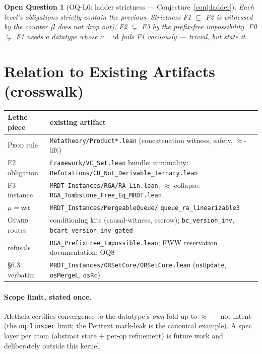\documentclass[11pt]{article}
\newtheorem{openq}[theorem]{Open Question}
\newcommand{\lean}[1]{\texttt{#1}}
\newcommand{\eqobs}{\approx}
\newcommand{\wit}{\mathsf{wit}}
\begin{document}
\begin{openq}[OQ-L6: ladder strictness --- Conjecture~\ref{conj:ladder}]
\label{oq:strictness}
Each level's obligations strictly contain the previous. Strictness
F1 $\subsetneq$ F2 is witnessed by the counter ($l$ does not drop out);
F2 $\subsetneq$ F3 by the prefix-free impossibility. F0 $\subsetneq$ F1
needs a datatype whose $\nu = \mathrm{id}$ fails F1 vacuously --- trivial,
but state it.
\end{openq}

\section{Relation to Existing Artifacts (crosswalk)}\label{sec:crosswalk}

\begin{center}
\small
\begin{tabular}{@{}lp{3.6in}@{}}
\toprule
Lethe piece & existing artifact \\
\midrule
\textsc{Prod} rule & \lean{Metatheory/Product*.lean} (concatenation
  witness, safety, $\eqobs$-lift) \\
F2 obligation & \lean{Framework/VC\_Set.lean} bundle; minimality:
  \lean{Refutations/CD\_Not\_Derivable\_Ternary.lean} \\
F3 instance & \lean{MRDT\_Instances/RGA/RA\_Lin.lean};
  $\eqobs$-collapse: \lean{RGA\_Tombstone\_Free\_Eq\_MRDT.lean} \\
$\mu = \wit$ & \lean{MRDT\_Instances/MergeableQueue/}
  \lean{queue\_ra\_linearizable3} \\
\textsc{Guard} routes & conditioning kits (causal-witness, escrow);
  \lean{bc\_version\_inv}, \lean{bcart\_version\_inv\_gated} \\
refusals & \lean{RGA\_PrefixFree\_Impossible.lean}; FWW reservation
  documentation; OQ8 \\
\S6.3 verbatim & \lean{MRDT\_Instances/ORSetCore/ORSetCore.lean}
  (\lean{osUpdate}, \lean{osMergeL}, \lean{osRc}) \\
\bottomrule
\end{tabular}
\end{center}

\paragraph{Scope limit, stated once.} Aletheia certifies convergence to
the datatype's \emph{own} fold up to $\eqobs$ --- not intent (the
\lean{oq:linspec} limit; the Peritext mark-leak is the canonical example).
A spec layer per atom (abstract state $+$ per-op refinement) is future
work and deliberately outside this kernel.
\end{document}
